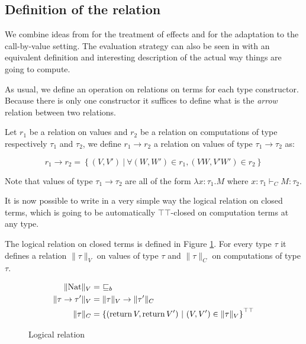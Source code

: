 \subsection{Definition of the relation}

We combine ideas from \cite{gom} 
for the treatment of effects and 
\cite{pitts1998existential} for the 
adaptation to the call-by-value setting.
The evaluation strategy can also be 
seen in \cite{dagand2015normalization}
with an equivalent definition and 
interesting description of the
actual way things are going to compute.

As usual, we define an operation on relations on terms 
for each type constructor. Because there is only one 
constructor it suffices to define what is the \emph{arrow}
relation between two relations.

\begin{definition}
    Let $r_1$ be a relation on values 
    and $r_2$ be a relation on computations 
    of type respectively $\tau_1$ and $\tau_2$, we define 
    $r_1 \to r_2$ a relation on 
    values of type $\tau_1 \to \tau_2$ as:

    \begin{equation*}
        r_1 \to r_2 = 
        \left\{ 
            (V,V')  
            ~|~
            \forall (W,W') \in r_1, 
            (VW, V'W') \in r_2 
        \right\}
    \end{equation*}

    Note that values of type $\tau_1 \to \tau_2$
    are all of the form $\lambda x:\tau_1. M$
    where $x:\tau_1 \vdash_C M : \tau_2$.
\end{definition}


It is now possible to write in a very simple way the logical 
relation on closed terms, which is going to be automatically $\top\top$-closed 
on computation terms at any type.

\begin{definition}
    The logical relation on closed terms is defined in
    Figure \ref{fig:logicalrel}. For every type 
    $\tau$ it defines a relation $\| \tau \|_V$ 
    on values of type $\tau$ and $\| \tau \|_C$ 
    on computations of type $\tau$.
\end{definition}

\begin{figure}[h]
    \begin{align*}
        \| \textnormal{Nat} \|_V &= \  \sqsubseteq_b \\
        \| \tau \to \tau' \|_V &= \| \tau \|_V \to \| \tau' \|_C \\
        \| \tau \|_C &= \left\{ (\operatorname{return} V, \operatorname{return} V') ~|~ (V,V') \in \|\tau\|_V
        \right\}^{\top\top}
    \end{align*}
    \caption{Logical relation}
    \label{fig:logicalrel}
\end{figure}

